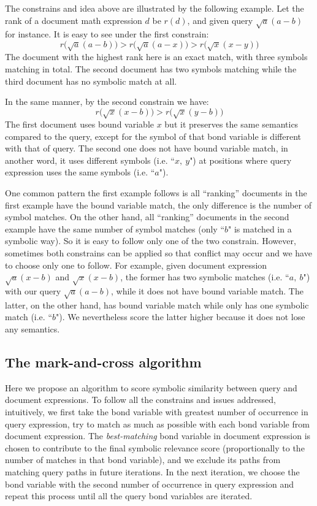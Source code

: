 The constrains and idea above are illustrated by the following example. 
Let the rank of a document math expression $d$ be $r(d)$, and given query $\sqrt a (a - b)$ for instance. 
It is easy to see under the first constrain: 
$$
r\big(\sqrt a (a - b)\big) > r\big(\sqrt a (a - x)\big) > r\big(\sqrt x (x - y)\big)
$$
The document with the highest rank here is an exact match, with three symbols matching in total. 
The second document has two symbols matching while the third document has no symbolic match at all. 

In the same manner, by the second constrain we have:
$$
r\big(\sqrt x (x - b)\big) > r\big(\sqrt x (y - b)\big)
$$
The first document uses bound variable $x$ but it preserves the same semantics compared to the query, except for the symbol of that bond variable is different with that of query.
The second one does not have bound variable match, in another word, it uses different symbols (i.e. ``$x,\ y$") at positions where query expression uses the same symbols (i.e. ``$a$").

One common pattern the first example follows is all ``ranking'' documents in the first example have the bound variable match, the only difference is the number of symbol matches. 
On the other hand, all ``ranking'' documents in the second example  have the same number of symbol matches (only ``$b$" is matched in a symbolic way). 
So it is easy to follow only one of the two constrain. 
However, sometimes both constrains can be applied so that conflict may occur and we have to choose only one to follow. 
For example, given document expression $\sqrt a (x - b)$ and $\sqrt x (x - b)$, the former has two symbolic matches (i.e. ``$a,\ b$") with our query $\sqrt a (a - b)$,
while it does not have bound variable match. 
The latter, on the other hand, has bound variable match while only has one symbolic match (i.e. ``$b$"). We nevertheless score the latter higher because it does not lose any semantics. 

\subsection{The mark-and-cross algorithm}
Here we propose an algorithm to score symbolic similarity between query and document expressions.
To follow all the constrains and issues addressed, 
intuitively, we first take the bond variable with greatest number of occurrence in query expression, try to match as much as possible with each bond variable from document expression. 
The \textit{best-matching} bond variable in document expression is chosen to contribute to the final symbolic relevance score (proportionally to the number of matches in that bond variable), 
and we exclude its paths from matching query paths in future iterations.
In the next iteration, we choose the bond variable with the second number of occurrence in query expression and repeat this process until all the query bond variables are iterated.

